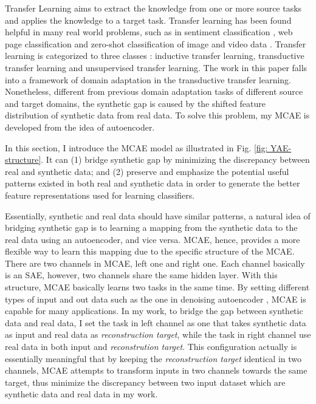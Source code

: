 \documentclass{iitthesis}
\begin{document}
Transfer Learning aims to extract the knowledge from one or more source tasks and applies the knowledge to a target task. Transfer learning has been found helpful in many real world problems, such as in sentiment classification \cite{Blitzer07Biographies}, web page classification\textcolor{red}{{} }\cite{Sarinnapakorn:2007:CST:1313047.1313197} and zero-shot classification of image and video data \cite{lampert13AwAPAMI,yanweiPAMIlatentattrib,yao2011action_part,yanweiembedding,yanweiBMVC,RohrbachCVPR12,rohrbach2010semantic_transfer,RichardNIPS13}. Transfer learning is categorized to three classes \cite{pan2009transfer_survey}: inductive transfer learning, transductive transfer learning and unsupervised transfer learning. The work in this paper falls into a framework of domain adaptation \cite{Ben-David:2010:TLD:1745449.1745461,Weinberger:2009:FHL:1553374.1553516}
in the transductive transfer learning. Nonetheless, different from previous domain adaptation tasks of different source and target domains, the synthetic gap is caused by the shifted feature distribution of synthetic data from real data. To solve this problem, my MCAE is developed from the idea of autoencoder.


In this section, I introduce the MCAE model as illustrated in Fig.
\ref{fig: YAE-structure}. It can (1) bridge synthetic gap by minimizing
the discrepancy between real and synthetic data; and (2) preserve
and emphasize the potential useful patterns existed in both real and
synthetic data in order to generate the better feature representations
used for learning classifiers. 
 
Essentially, synthetic and real data should have similar patterns, a natural
idea of bridging synthetic gap is to learning a mapping from the synthetic data to the real data using an autoencoder, and vice versa. MCAE, hence, provides a more flexible way to learn this mapping due to the specific structure of the MCAE. There are two channels in MCAE, left one and right one. Each channel basically is an SAE, however, two channels share the same hidden layer. With this structure, MCAE basically learns two tasks in the same time. By setting different types of input and out data such as the one in denoising autoencoder \cite{VP:10}, MCAE is capable for many applications. In my work, to bridge the gap between synthetic data and real data, I set the task in left channel as one that takes synthetic data as input and real data as \textit{reconstruction target}, while the task in right channel use real data in both input and \textit{reconstrution target}. This configuration actually is essentially meaningful that by keeping the \textit{reconstruction target} identical in two channels, MCAE attempts to transform inputs in two channels towards the same target, thus minimize the discrepancy between two input dataset which are synthetic data and real data in my work.
\end{document}

